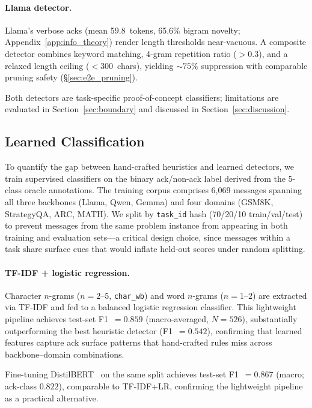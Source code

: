 \paragraph{Llama detector.} Llama's verbose acks (mean 59.8~tokens, 65.6\% bigram novelty; Appendix~\ref{app:info_theory}) render length thresholds near-vacuous. A composite detector combines keyword matching, 4-gram repetition ratio ($> 0.3$), and a relaxed length ceiling ($< 300$~chars), yielding ${\sim}75\%$ suppression with comparable pruning safety (\S\ref{sec:e2e_pruning}).

Both detectors are task-specific proof-of-concept classifiers; limitations are evaluated in Section~\ref{sec:boundary} and discussed in Section~\ref{sec:discussion}.

\subsection{Learned Classification}
\label{sec:learned_classifier}

To quantify the gap between hand-crafted heuristics and learned detectors, we train supervised classifiers on the binary ack/non-ack label derived from the 5-class oracle annotations. The training corpus comprises 6{,}069 messages spanning all three backbones (Llama, Qwen, Gemma) and four domains (GSM8K, StrategyQA, ARC, MATH). We split by \texttt{task\_id} hash (70/20/10 train/val/test) to prevent messages from the same problem instance from appearing in both training and evaluation sets---a critical design choice, since messages within a task share surface cues that would inflate held-out scores under random splitting.

\paragraph{TF-IDF + logistic regression.} Character $n$-grams ($n{=}2$--$5$, \texttt{char\_wb}) and word $n$-grams ($n{=}1$--$2$) are extracted via TF-IDF and fed to a balanced logistic regression classifier. This lightweight pipeline achieves test-set F1~$= 0.859$ (macro-averaged, $N{=}526$), substantially outperforming the best heuristic detector (F1~$= 0.542$), confirming that learned features capture ack surface patterns that hand-crafted rules miss across backbone--domain combinations.

Fine-tuning DistilBERT~\cite{sanh_distilbert_2019} on the same split achieves test-set F1~$= 0.867$ (macro; ack-class $0.822$), comparable to TF-IDF+LR, confirming the lightweight pipeline as a practical alternative.

